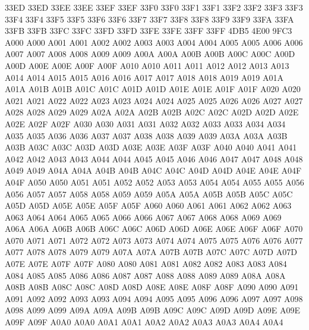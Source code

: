 \ID 33ED 33ED
\ID 33EE 33EE
\ID 33EF 33EF
\ID 33F0 33F0
\ID 33F1 33F1
\ID 33F2 33F2
\ID 33F3 33F3
\ID 33F4 33F4
\ID 33F5 33F5
\ID 33F6 33F6
\ID 33F7 33F7
\ID 33F8 33F8
\ID 33F9 33F9
\ID 33FA 33FA
\ID 33FB 33FB
\ID 33FC 33FC
\ID 33FD 33FD
\ID 33FE 33FE
\ID 33FF 33FF
 4DB5
\ID 4E00 9FC3
\ID A000 A000
\ID A001 A001
\ID A002 A002
\ID A003 A003
\ID A004 A004
\ID A005 A005
\ID A006 A006
\ID A007 A007
\ID A008 A008
\ID A009 A009
\ID A00A A00A
\ID A00B A00B
\ID A00C A00C
\ID A00D A00D
\ID A00E A00E
\ID A00F A00F
\ID A010 A010
\ID A011 A011
\ID A012 A012
\ID A013 A013
\ID A014 A014
\NS A015 A015
\ID A016 A016
\ID A017 A017
\ID A018 A018
\ID A019 A019
\ID A01A A01A
\ID A01B A01B
\ID A01C A01C
\ID A01D A01D
\ID A01E A01E
\ID A01F A01F
\ID A020 A020
\ID A021 A021
\ID A022 A022
\ID A023 A023
\ID A024 A024
\ID A025 A025
\ID A026 A026
\ID A027 A027
\ID A028 A028
\ID A029 A029
\ID A02A A02A
\ID A02B A02B
\ID A02C A02C
\ID A02D A02D
\ID A02E A02E
\ID A02F A02F
\ID A030 A030
\ID A031 A031
\ID A032 A032
\ID A033 A033
\ID A034 A034
\ID A035 A035
\ID A036 A036
\ID A037 A037
\ID A038 A038
\ID A039 A039
\ID A03A A03A
\ID A03B A03B
\ID A03C A03C
\ID A03D A03D
\ID A03E A03E
\ID A03F A03F
\ID A040 A040
\ID A041 A041
\ID A042 A042
\ID A043 A043
\ID A044 A044
\ID A045 A045
\ID A046 A046
\ID A047 A047
\ID A048 A048
\ID A049 A049
\ID A04A A04A
\ID A04B A04B
\ID A04C A04C
\ID A04D A04D
\ID A04E A04E
\ID A04F A04F
\ID A050 A050
\ID A051 A051
\ID A052 A052
\ID A053 A053
\ID A054 A054
\ID A055 A055
\ID A056 A056
\ID A057 A057
\ID A058 A058
\ID A059 A059
\ID A05A A05A
\ID A05B A05B
\ID A05C A05C
\ID A05D A05D
\ID A05E A05E
\ID A05F A05F
\ID A060 A060
\ID A061 A061
\ID A062 A062
\ID A063 A063
\ID A064 A064
\ID A065 A065
\ID A066 A066
\ID A067 A067
\ID A068 A068
\ID A069 A069
\ID A06A A06A
\ID A06B A06B
\ID A06C A06C
\ID A06D A06D
\ID A06E A06E
\ID A06F A06F
\ID A070 A070
\ID A071 A071
\ID A072 A072
\ID A073 A073
\ID A074 A074
\ID A075 A075
\ID A076 A076
\ID A077 A077
\ID A078 A078
\ID A079 A079
\ID A07A A07A
\ID A07B A07B
\ID A07C A07C
\ID A07D A07D
\ID A07E A07E
\ID A07F A07F
\ID A080 A080
\ID A081 A081
\ID A082 A082
\ID A083 A083
\ID A084 A084
\ID A085 A085
\ID A086 A086
\ID A087 A087
\ID A088 A088
\ID A089 A089
\ID A08A A08A
\ID A08B A08B
\ID A08C A08C
\ID A08D A08D
\ID A08E A08E
\ID A08F A08F
\ID A090 A090
\ID A091 A091
\ID A092 A092
\ID A093 A093
\ID A094 A094
\ID A095 A095
\ID A096 A096
\ID A097 A097
\ID A098 A098
\ID A099 A099
\ID A09A A09A
\ID A09B A09B
\ID A09C A09C
\ID A09D A09D
\ID A09E A09E
\ID A09F A09F
\ID A0A0 A0A0
\ID A0A1 A0A1
\ID A0A2 A0A2
\ID A0A3 A0A3
\ID A0A4 A0A4
